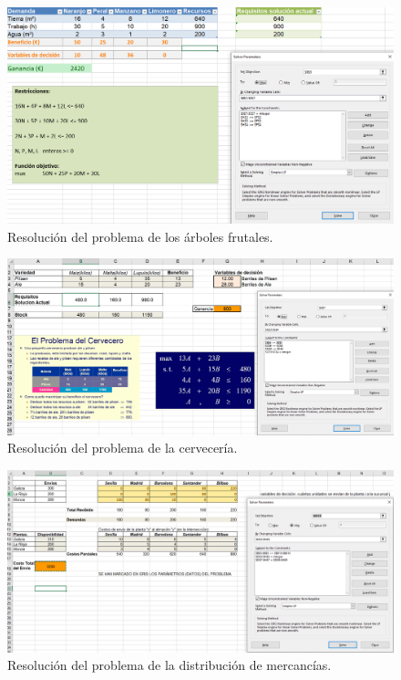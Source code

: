 \documentclass[13pt,a4paper]{article}
\begin{document}
\begin{figure}[H]\center\includegraphics[width=.95\linewidth]{img/solver.png}\caption{Resolución del problema de los árboles frutales.}\end{figure}

\begin{figure}[H]\center\includegraphics[width=.95\linewidth]{img/solver2.png}\caption{Resolución del problema de la cervecería.}\end{figure}

\begin{figure}[H]\center\includegraphics[width=.95\linewidth]{img/solver3.png}\caption{Resolución del problema de la distribución de mercancías.}\end{figure}
\end{document}
